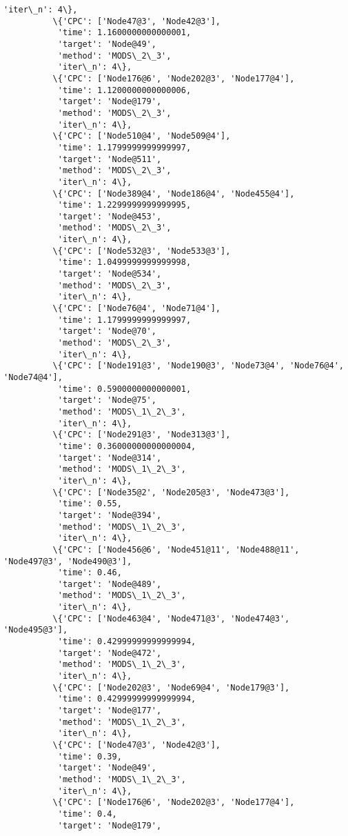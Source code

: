 \documentclass[11pt]{article}
\begin{document}
\begin{Verbatim}[commandchars=\\\{\}]
           'iter\_n': 4\},
          \{'CPC': ['Node47@3', 'Node42@3'],
           'time': 1.1600000000000001,
           'target': 'Node@49',
           'method': 'MODS\_2\_3',
           'iter\_n': 4\},
          \{'CPC': ['Node176@6', 'Node202@3', 'Node177@4'],
           'time': 1.1200000000000006,
           'target': 'Node@179',
           'method': 'MODS\_2\_3',
           'iter\_n': 4\},
          \{'CPC': ['Node510@4', 'Node509@4'],
           'time': 1.1799999999999997,
           'target': 'Node@511',
           'method': 'MODS\_2\_3',
           'iter\_n': 4\},
          \{'CPC': ['Node389@4', 'Node186@4', 'Node455@4'],
           'time': 1.2299999999999995,
           'target': 'Node@453',
           'method': 'MODS\_2\_3',
           'iter\_n': 4\},
          \{'CPC': ['Node532@3', 'Node533@3'],
           'time': 1.0499999999999998,
           'target': 'Node@534',
           'method': 'MODS\_2\_3',
           'iter\_n': 4\},
          \{'CPC': ['Node76@4', 'Node71@4'],
           'time': 1.1799999999999997,
           'target': 'Node@70',
           'method': 'MODS\_2\_3',
           'iter\_n': 4\},
          \{'CPC': ['Node191@3', 'Node190@3', 'Node73@4', 'Node76@4', 'Node74@4'],
           'time': 0.5900000000000001,
           'target': 'Node@75',
           'method': 'MODS\_1\_2\_3',
           'iter\_n': 4\},
          \{'CPC': ['Node291@3', 'Node313@3'],
           'time': 0.36000000000000004,
           'target': 'Node@314',
           'method': 'MODS\_1\_2\_3',
           'iter\_n': 4\},
          \{'CPC': ['Node35@2', 'Node205@3', 'Node473@3'],
           'time': 0.55,
           'target': 'Node@394',
           'method': 'MODS\_1\_2\_3',
           'iter\_n': 4\},
          \{'CPC': ['Node456@6', 'Node451@11', 'Node488@11', 'Node497@3', 'Node490@3'],
           'time': 0.46,
           'target': 'Node@489',
           'method': 'MODS\_1\_2\_3',
           'iter\_n': 4\},
          \{'CPC': ['Node463@4', 'Node471@3', 'Node474@3', 'Node495@3'],
           'time': 0.42999999999999994,
           'target': 'Node@472',
           'method': 'MODS\_1\_2\_3',
           'iter\_n': 4\},
          \{'CPC': ['Node202@3', 'Node69@4', 'Node179@3'],
           'time': 0.42999999999999994,
           'target': 'Node@177',
           'method': 'MODS\_1\_2\_3',
           'iter\_n': 4\},
          \{'CPC': ['Node47@3', 'Node42@3'],
           'time': 0.39,
           'target': 'Node@49',
           'method': 'MODS\_1\_2\_3',
           'iter\_n': 4\},
          \{'CPC': ['Node176@6', 'Node202@3', 'Node177@4'],
           'time': 0.4,
           'target': 'Node@179',

\end{Verbatim}
\end{document}
